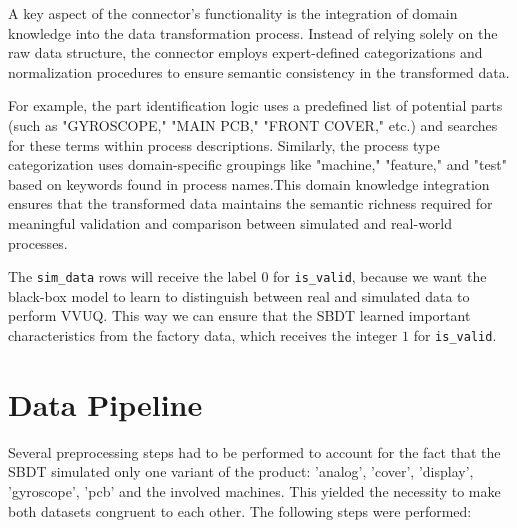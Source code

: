 A key aspect of the connector's functionality is the integration of domain knowledge into the data transformation process. Instead of relying solely on the raw data structure, the connector employs expert-defined categorizations and normalization procedures to ensure semantic consistency in the transformed data.

For example, the part identification logic uses a predefined list of potential parts (such as "GYROSCOPE," "MAIN PCB," "FRONT COVER," etc.) and searches for these terms within process descriptions. Similarly, the process type categorization uses domain-specific groupings like "machine," "feature," and "test" based on keywords found in process names.This domain knowledge integration ensures that the transformed data maintains the semantic richness required for meaningful validation and comparison between simulated and real-world processes.

The \texttt{sim\_data} rows will receive the label $0$ for \texttt{is\_valid}, because we want the black-box model to learn to distinguish between real and simulated data to perform VVUQ. This way we can ensure that the SBDT learned important characteristics from the factory data, which receives the integer $1$ for \texttt{is\_valid}.


\section{Data Pipeline}

Several preprocessing steps had to be performed to account for the fact that the SBDT simulated only one variant of the product: 'analog', 'cover', 'display', 'gyroscope', 'pcb' and the involved machines. This yielded the necessity to make both datasets congruent to each other. The following steps were performed:


